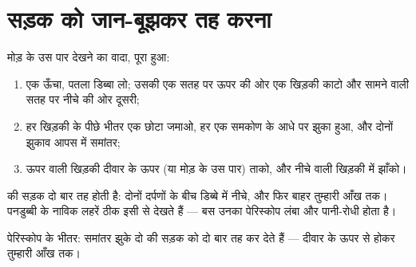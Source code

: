 \section{सड़क को जान-बूझकर तह करना}

\begin{method}[पेरिस्कोप बनाना]\label{met:g5:mirrors-reflection:periscope}
मोड़ के उस पार देखने का वादा, पूरा हुआ:
\begin{enumerate}
  \item एक ऊँचा, पतला डिब्बा लो; उसकी एक सतह पर ऊपर की ओर एक खिड़की
        काटो और सामने वाली सतह पर नीचे की ओर दूसरी;
  \item हर खिड़की के पीछे भीतर एक छोटा  जमाओ, हर एक समकोण के
        आधे पर झुका हुआ, और दोनों झुकाव आपस में समांतर;
  \item ऊपर वाली खिड़की दीवार के ऊपर (या मोड़ के उस पार) ताको, और
        नीचे वाली खिड़की में झाँको।
\end{enumerate}
 की सड़क दो बार तह होती है: दोनों दर्पणों के बीच डिब्बे में
नीचे, और फिर बाहर तुम्हारी आँख तक। पनडुब्बी के नाविक लहरें ठीक इसी से
देखते हैं --- बस उनका पेरिस्कोप लंबा और पानी-रोधी होता है।
\end{method}

\begin{omfigure}

{\small पेरिस्कोप के भीतर: समांतर झुके दो   की सड़क को दो
बार तह कर देते हैं --- दीवार के ऊपर से होकर तुम्हारी आँख तक।}
\end{omfigure}

